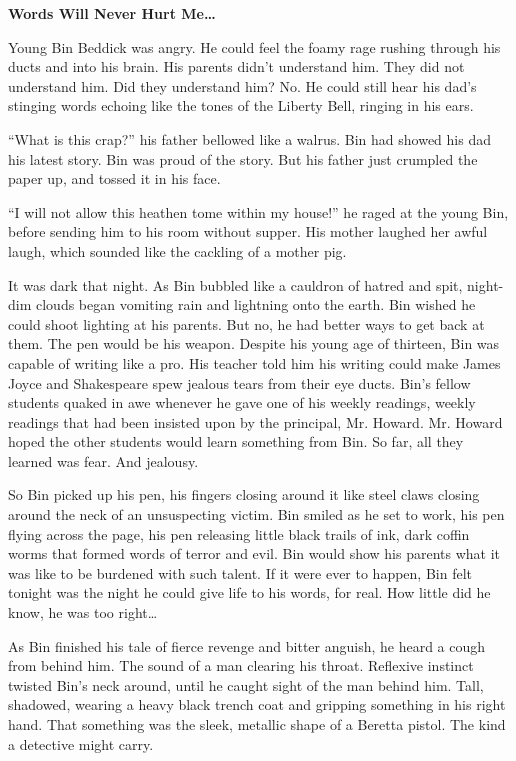 {\bf Words Will Never Hurt Me{\ldots}}



Young Bin Beddick was angry. He could feel the foamy rage rushing
through his ducts and into his brain. His parents didn't
understand him. They did not understand him. Did they understand
him? No. He could still hear his dad's stinging words echoing
like the tones of the Liberty Bell, ringing in his ears.

``What is this crap?'' his father bellowed like a walrus.
Bin had showed his dad his latest story. Bin was proud of the
story. But his father just crumpled the paper up, and tossed it in
his face.

``I will not allow this heathen tome within my house!''
he raged at the young Bin, before sending him to his room without
supper. His mother laughed her awful laugh, which sounded like the
cackling of a mother pig.

It was dark that night. As Bin bubbled like a cauldron of hatred
and spit, night-dim clouds began vomiting rain and lightning onto
the earth. Bin wished he could shoot lighting at his parents. But
no, he had better ways to get back at them. The pen would be his
weapon. Despite his young age of thirteen, Bin was capable of
writing like a pro. His teacher told him his writing could make
James Joyce and Shakespeare spew jealous tears from their eye
ducts. Bin's fellow students quaked in awe whenever he gave
one of his weekly readings, weekly readings that had been insisted
upon by the principal, Mr. Howard. Mr. Howard hoped the other
students would learn something from Bin. So far, all they learned
was fear. And jealousy.

So Bin picked up his pen, his fingers closing around it like steel
claws closing around the neck of an unsuspecting victim. Bin smiled
as he set to work, his pen flying across the page, his pen
releasing little black trails of ink, dark coffin worms that formed
words of terror and evil. Bin would show his parents what it was
like to be burdened with such talent. If it were ever to happen,
Bin felt tonight was the night he could give life to his words, for
real. How little did he know, he was too right{\ldots}

As Bin finished his tale of fierce revenge and bitter anguish, he
heard a cough from behind him. The sound of a man clearing his
throat. Reflexive instinct twisted Bin's neck around, until
he caught sight of the man behind him. Tall, shadowed, wearing a
heavy black trench coat and gripping something in his right hand.
That something was the sleek, metallic shape of a Beretta pistol.
The kind a detective might carry.

